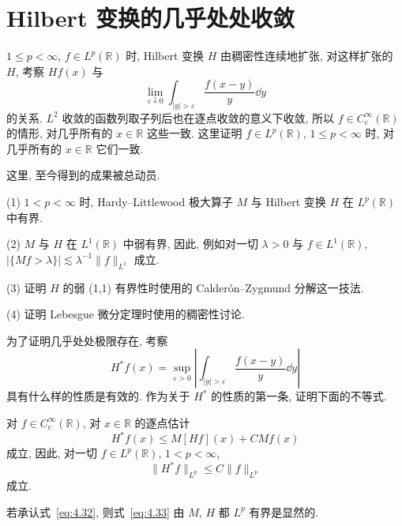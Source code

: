 
\section{Hilbert 变换的几乎处处收敛}\label{sec:4.5}

$1 \leq p < \infty$, $f \in L^{p}(\mathbb{R})$ 时, Hilbert 变换 $H$ 由稠密性连续地扩张, 对这样扩张的 $H$, 考察 $Hf(x)$ 与
\[
\lim_{\varepsilon \downarrow 0}\int_{|y| > \varepsilon}\frac{f(x-y)}{y}\dd y
\]
的关系. $L^{2}$ 收敛的函数列取子列后也在逐点收敛的意义下收敛, 所以 $f \in C_{\mathrm{c}}^{\infty}(\mathbb{R})$ 的情形, 对几乎所有的 $x \in \mathbb{R}$ 这些一致. 这里证明 $f \in L^{p}(\mathbb{R})$, $1 \leq p < \infty$ 时, 对几乎所有的 $x \in \mathbb{R}$ 它们一致.

这里, 至今得到的成果被总动员.

(1) $1 < p < \infty$ 时, Hardy--Littlewood 极大算子 $M$ 与 Hilbert 变换 $H$ 在 $L^{p}(\mathbb{R})$ 中有界.

(2) $M$ 与 $H$ 在 $L^{1}(\mathbb{R})$ 中弱有界, 因此, 例如对一切 $\lambda > 0$ 与 $f \in L^{1}(\mathbb{R})$, $|\{Mf > \lambda\}| \lesssim \lambda^{-1}\|f\|_{L^{1}}$ 成立.

(3) 证明 $H$ 的弱 (1,1) 有界性时使用的 Calderón--Zygmund 分解这一技法.

(4) 证明 Lebesgue 微分定理时使用的稠密性讨论.

为了证明几乎处处极限存在, 考察
\[
H^{*}f(x) = \sup_{\varepsilon > 0}\left|\int_{|y| > \varepsilon}\frac{f(x-y)}{y}\dd y\right|
\]
具有什么样的性质是有效的. 作为关于 $H^{*}$ 的性质的第一条, 证明下面的不等式.

\begin{theorem}\label{thm:4.7}
对 $f \in C_{\mathrm{c}}^{\infty}(\mathbb{R})$, 对 $x \in \mathbb{R}$ 的逐点估计
\begin{equation}\tag{4.32}
H^{*}f(x) \leq M[Hf](x) + CMf(x)
\label{eq:4.32}
\end{equation}
成立, 因此, 对一切 $f \in L^{p}(\mathbb{R})$, $1 < p < \infty$,
\begin{equation}\tag{4.33}
\|H^{*}f\|_{L^{p}} \leq C\|f\|_{L^{p}}
\label{eq:4.33}
\end{equation}
成立.
\end{theorem}

若承认式~\eqref{eq:4.32}, 则式~\eqref{eq:4.33} 由 $M$, $H$ 都 $L^{p}$ 有界是显然的.

